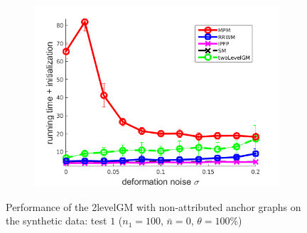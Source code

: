 \begin{figure}[h]
\begin{subfigure}[b]{0.3\textwidth}
	\end{subfigure} 
	\begin{subfigure}[b]{0.3\textwidth}
		\centering
		\includegraphics[scale=0.25]{"chapter3/fig/SyntheticTest/no_descr/Results_v4.3.3/Test2/time_summary_avg10t"} 
	\end{subfigure} 
	\caption[Performance of the 2levelGM with non-attributed anchor graphs on the synthetic data (test $1$)]{Performance of the 2levelGM with non-attributed anchor graphs on the synthetic data: test $1$ ($n_1=100$, $\bar{n}=0$, $\theta=100\%$)}
	\label{fig:synTest1_ver433}
\end{figure}
\vspace{-10pt}
